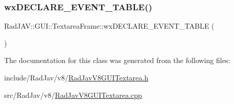 \subsubsection{\texorpdfstring{wx\+D\+E\+C\+L\+A\+R\+E\+\_\+\+E\+V\+E\+N\+T\+\_\+\+T\+A\+B\+L\+E()}{wxDECLARE\_EVENT\_TABLE()}}
{\footnotesize\ttfamily Rad\+J\+A\+V\+::\+G\+U\+I\+::\+Textarea\+Frame\+::wx\+D\+E\+C\+L\+A\+R\+E\+\_\+\+E\+V\+E\+N\+T\+\_\+\+T\+A\+B\+LE (\begin{DoxyParamCaption}{ }\end{DoxyParamCaption})\hspace{0.3cm}{\ttfamily [protected]}}



The documentation for this class was generated from the following files\+:\begin{DoxyCompactItemize}
\item 
include/\+Rad\+Jav/v8/\mbox{\hyperlink{_rad_jav_v8_g_u_i_textarea_8h}{Rad\+Jav\+V8\+G\+U\+I\+Textarea.\+h}}\item 
src/\+Rad\+Jav/v8/\mbox{\hyperlink{_rad_jav_v8_g_u_i_textarea_8cpp}{Rad\+Jav\+V8\+G\+U\+I\+Textarea.\+cpp}}\end{DoxyCompactItemize}
